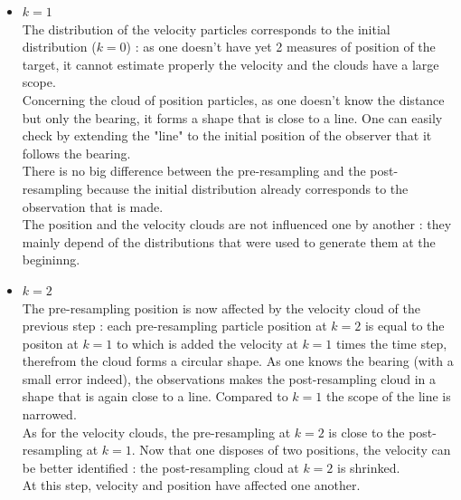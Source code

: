 \documentclass[english,DIV=13]{scrreprt}
\begin{document}
\begin{itemize}
\item $k=1$\\
The distribution of the velocity particles corresponds to the initial distribution ($k=0$) : as one doesn't have yet 2 measures 
of position of the target, it cannot estimate properly the velocity and the clouds have a large scope.\\
Concerning the cloud of position particles, as one doesn't know the distance but only the bearing, it forms a shape
that is close to a line. One can easily check by extending the "line" to the initial position of the observer that it 
follows the bearing.\\
There is no big difference between the pre-resampling and the post-resampling because the initial distribution already corresponds
to the observation that is made.\\
The position and the velocity clouds are not influenced one by another : they mainly depend of the distributions that were
used to generate them at the begininng.

\item $k=2$\\
The pre-resampling position is now affected by the velocity cloud of the previous step : each pre-resampling particle position
at $k=2$ is equal to the positon at $k=1$ to which is added the velocity at $k=1$ times the time step, therefrom the cloud forms
a circular shape. As one knows the bearing (with a small error indeed), the observations makes the post-resampling cloud
in a shape that is again close to a line. Compared to $k=1$ the scope of the line is narrowed. \\
As for the velocity clouds, the pre-resampling at $k=2$ is close to the post-resampling at $k=1$. 
Now that one disposes of two positions, the velocity can be better identified : the post-resampling cloud
at $k=2$ is shrinked. \\
At this step, velocity and position have affected one another.







\end{itemize}
\end{document}
